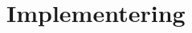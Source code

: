 \documentclass[Rapport/Rapport_main.tex]{subfiles}
\begin{document}
\section{Implementering}
\end{document}
